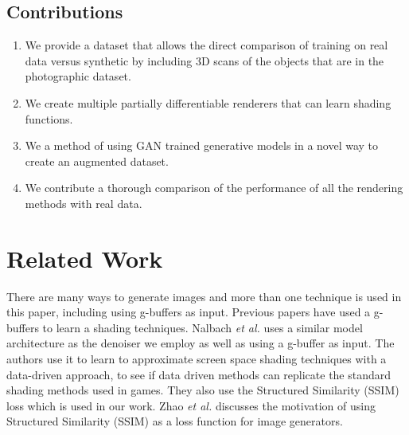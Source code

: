 \documentclass[10pt,twocolumn,letterpaper]{article}
\begin{document}
\subsection{Contributions}
\begin{enumerate}
\item We provide a dataset that allows the direct comparison of training on real data versus synthetic by including 3D scans of the objects that are in the photographic dataset.
\item We create multiple partially differentiable renderers that can learn shading functions.
\item We a method of using GAN trained generative models in a novel way to create an augmented dataset.
\item We contribute a thorough comparison of the performance of all the rendering methods with real data.
\end{enumerate}
\section{Related Work}

There are many ways to generate images and more than one technique is used in this paper, including using g-buffers as input.  Previous papers have used a g-buffers to learn a shading techniques.  Nalbach \textit{et al.} \cite{DBLP:journals/corr/NalbachAMSR16} uses a similar model architecture as the denoiser we employ as well as using a g-buffer as input.  The authors use it to learn to approximate screen space shading techniques with a data-driven approach, to see if data driven methods can replicate the standard shading methods used in games.  They also use the Structured Similarity (SSIM) loss which is used in our work. 
Zhao \textit{et al.} \cite{DBLP:journals/corr/ZhaoGFK15} discusses the motivation of using Structured Similarity (SSIM) as a loss function for image generators.

\end{document}
